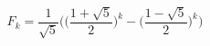 \documentclass[preview]{standalone}
\begin{document}
\begin{center}
$$F_k = \frac{1}{\sqrt{5}} \big( \big(\frac{1 + \sqrt{5}}{2}\big)^k - \big(\frac{1 - \sqrt{5}}{2})^k \big)$$
\end{center}
\end{document}
